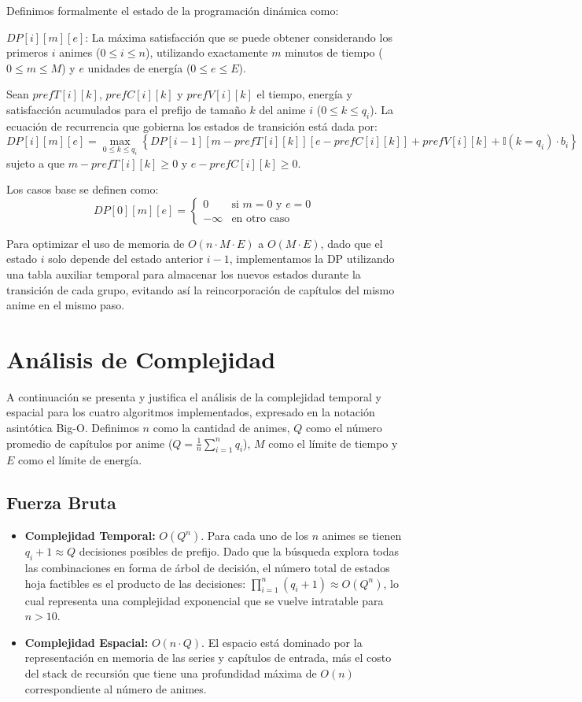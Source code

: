\documentclass[11pt,spanish]{article} %
\begin{document}
Definimos formalmente el estado de la programación dinámica como:
\begin{center}
$DP[i][m][e]$: La máxima satisfacción que se puede obtener considerando los primeros $i$ animes ($0 \le i \le n$), utilizando exactamente $m$ minutos de tiempo ($0 \le m \le M$) y $e$ unidades de energía ($0 \le e \le E$).
\end{center}

Sean $prefT[i][k]$, $prefC[i][k]$ y $prefV[i][k]$ el tiempo, energía y satisfacción acumulados para el prefijo de tamaño $k$ del anime $i$ ($0 \le k \le q_i$). La ecuación de recurrencia que gobierna los estados de transición está dada por:
\[
DP[i][m][e] = \max_{0 \le k \le q_i} \left\{ DP[i-1][m - prefT[i][k]][e - prefC[i][k]] + prefV[i][k] + \mathbb{I}(k = q_i) \cdot b_i \right\}
\]
sujeto a que $m - prefT[i][k] \ge 0$ y $e - prefC[i][k] \ge 0$.

Los casos base se definen como:
\[
DP[0][m][e] = \begin{cases} 
0 & \text{si } m = 0 \text{ y } e = 0 \\
-\infty & \text{en otro caso}
\end{cases}
\]

Para optimizar el uso de memoria de $O(n \cdot M \cdot E)$ a $O(M \cdot E)$, dado que el estado $i$ solo depende del estado anterior $i-1$, implementamos la DP utilizando una tabla auxiliar temporal para almacenar los nuevos estados durante la transición de cada grupo, evitando así la reincorporación de capítulos del mismo anime en el mismo paso.

\section{Análisis de Complejidad}

A continuación se presenta y justifica el análisis de la complejidad temporal y espacial para los cuatro algoritmos implementados, expresado en la notación asintótica Big-O. Definimos $n$ como la cantidad de animes, $Q$ como el número promedio de capítulos por anime ($Q = \frac{1}{n}\sum_{i=1}^n q_i$), $M$ como el límite de tiempo y $E$ como el límite de energía.

\subsection{Fuerza Bruta}
\begin{itemize}
    \item \textbf{Complejidad Temporal:} $O(Q^n)$. Para cada uno de los $n$ animes se tienen $q_i + 1 \approx Q$ decisiones posibles de prefijo. Dado que la búsqueda explora todas las combinaciones en forma de árbol de decisión, el número total de estados hoja factibles es el producto de las decisiones: $\prod_{i=1}^n (q_i + 1) \approx O(Q^n)$, lo cual representa una complejidad exponencial que se vuelve intratable para $n > 10$.
    \item \textbf{Complejidad Espacial:} $O(n \cdot Q)$. El espacio está dominado por la representación en memoria de las series y capítulos de entrada, más el costo del stack de recursión que tiene una profundidad máxima de $O(n)$ correspondiente al número de animes.
\end{itemize}
\end{document}
